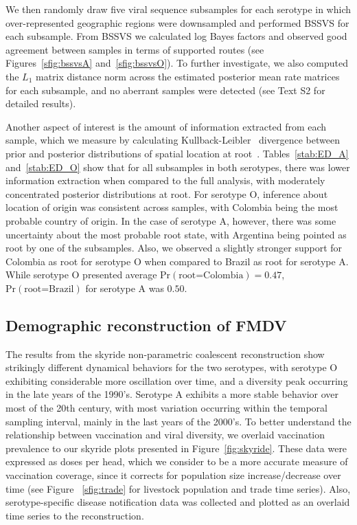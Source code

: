 \documentclass[10pt]{article}
\begin{document}
We then randomly draw five viral sequence subsamples for each serotype in which over-represented geographic regions were downsampled and performed BSSVS for each subsample.
From BSSVS we calculated log Bayes factors and observed good agreement between samples in terms of supported routes (see Figures~\ref{sfig:bssvsA} and~\ref{sfig:bssvsO}).
To further investigate, we also computed the $L_1$ matrix distance norm across the estimated posterior mean rate matrices for each subsample, and no aberrant samples were detected (see Text S2 for detailed results).

Another aspect of interest is the amount of information extracted from each sample, which we measure by calculating Kullback-Leibler~\cite{KL} divergence between prior and posterior distributions of spatial location at root~\cite{roots}.
Tables~\ref{stab:ED_A} and~\ref{stab:ED_O} show that for all subsamples in both serotypes, there was lower information extraction when compared to the full analysis, with moderately concentrated posterior distributions at root.
For serotype O, inference about location of origin was consistent across samples, with Colombia being the most probable country of origin.
In the case of serotype A, however, there was some uncertainty about the most probable root state, with Argentina being pointed as root by one of the subsamples.
Also, we observed a slightly stronger support for Colombia as root for serotype O when compared to Brazil as root for serotype A.
While serotype O presented average $\mbox{Pr}(\text{root=Colombia})=0.47$, $\mbox{Pr}(\text{root=Brazil})$ for serotype A was $0.50$.

\subsection*{Demographic reconstruction of FMDV}

The results from the skyride non-parametric coalescent reconstruction show strikingly different dynamical behaviors for the two serotypes, with serotype O exhibiting considerable more oscillation over time, and a diversity peak occurring in the late years of the 1990's.
Serotype A exhibits a more stable behavior over most of the 20th century, with most variation occurring within the temporal sampling interval, mainly in the last years of the 2000's.
To better understand the relationship between vaccination and viral diversity, we overlaid vaccination prevalence to our skyride plots presented in Figure~\ref{fig:skyride}.
These data were expressed as doses per head, which we consider to be a more accurate measure of vaccination coverage, since it corrects for population size increase/decrease over time (see Figure ~\ref{sfig:trade} for livestock population and trade time series). 
Also, serotype-specific disease notification data was collected and plotted as an overlaid time series to the reconstruction. 
\end{document}
